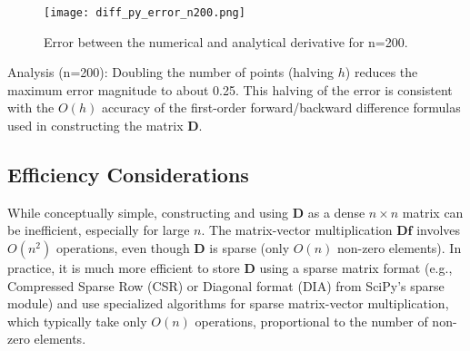 \documentclass{article}
\begin{document}
\begin{figure}[H]
\centering
\texttt{[image: diff\_py\_error\_n200.png]}
\caption{Error between the numerical and analytical derivative for n=200.}
\label{fig:diff_py_error_n200}
\end{figure}

Analysis (n=200): Doubling the number of points (halving $h$) reduces the maximum error magnitude to about 0.25. This halving of the error is consistent with the $O(h)$ accuracy of the first-order forward/backward difference formulas used in constructing the matrix $\mathbf{D}$.

\subsection{Efficiency Considerations}
While conceptually simple, constructing and using $\mathbf{D}$ as a dense $n \times n$ matrix can be inefficient, especially for large $n$. The matrix-vector multiplication $\mathbf{D}\mathbf{f}$ involves $O(n^2)$ operations, even though $\mathbf{D}$ is sparse (only $O(n)$ non-zero elements). In practice, it is much more efficient to store $\mathbf{D}$ using a sparse matrix format (e.g., Compressed Sparse Row (CSR) or Diagonal format (DIA) from SciPy's sparse module) and use specialized algorithms for sparse matrix-vector multiplication, which typically take only $O(n)$ operations, proportional to the number of non-zero elements.
\end{document}
